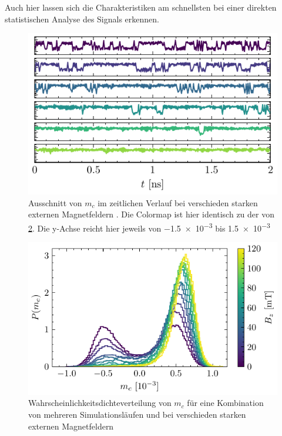 \documentclass[main.tex]{subfiles}
\begin{document}
Auch hier lassen sich die Charakteristiken am schnellsten bei einer direkten statistischen Analyse des Signals erkennen.

\begin{figure}[H]
    \centering
    \includegraphics{bilder/plots/max_Bz/mc_time.pdf}
    \caption{Ausschnitt von \(m_c\) im zeitlichen Verlauf bei verschieden starken externen Magnetfeldern . Die Colormap ist hier identisch zu der von \cref{fig:b-hist}. Die y-Achse reicht hier jeweils von \num{-1.5e-3} bis \num{+1.5e-3}}\label{fig:b-time}    
\end{figure}


\begin{figure}[H]
    \centering
    \includegraphics{bilder/plots/max_Bz/mc_hist.pdf}
    \caption{Wahrscheinlichkeitsdichteverteilung von \(m_c\) für eine Kombination von mehreren Simulationsläufen und bei verschieden starken externen Magnetfeldern}\label{fig:b-hist}    
\end{figure}
\end{document}
